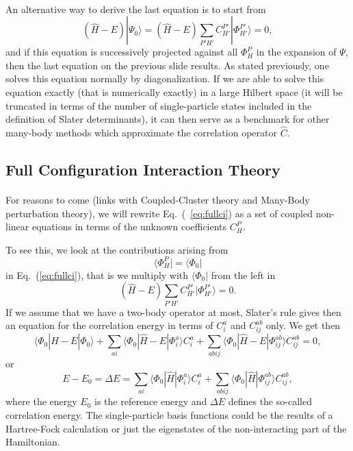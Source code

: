\documentclass[%
twoside,                 %
final,                   %
10pt]{article}
\begin{document}
\paragraph{}
An alternative way to derive the last equation is to start from 
\[
(\hat{H} -E)|\Psi_0\rangle = (\hat{H} -E)\sum_{P'H'}C_{H'}^{P'}|\Phi_{H'}^{P'} \rangle=0, 
\]
and if this equation is successively projected against all $\Phi_H^P$ in the expansion of $\Psi$, then the last equation on the previous slide
results.   As stated previously, one solves this equation normally by diagonalization. If we are able to solve this equation exactly (that is
numerically exactly) in a large Hilbert space (it will be truncated in terms of the number of single-particle states included in the definition
of Slater determinants), it can then serve as a benchmark for other many-body methods which approximate the correlation operator
$\hat{C}$.



\subsection*{Full Configuration Interaction Theory}

\paragraph{}
For reasons to come (links with Coupled-Cluster theory and Many-Body perturbation theory), 
we will rewrite Eq.~(~\ref{eq:fullci}) as a set of coupled non-linear equations in terms of the unknown coefficients $C_H^P$. 

To see this, we look at the contributions arising from 
\[
\langle \Phi_H^P | = \langle \Phi_0|
\]
in  Eq.~(\ref{eq:fullci}), that is we multiply with $\langle \Phi_0 |$
from the left in 
\[
(\hat{H} -E)\sum_{P'H'}C_{H'}^{P'}|\Phi_{H'}^{P'} \rangle=0. 
\]
If we assume that we have a two-body operator at most, Slater's rule gives then an equation for the 
correlation energy in terms of $C_i^a$ and $C_{ij}^{ab}$ only.  We get then
\[
\langle \Phi_0 | \hat{H} -E| \Phi_0\rangle + \sum_{ai}\langle \Phi_0 | \hat{H} -E|\Phi_{i}^{a} \rangle C_{i}^{a}+
\sum_{abij}\langle \Phi_0 | \hat{H} -E|\Phi_{ij}^{ab} \rangle C_{ij}^{ab}=0,
\]
or 
\[
E-E_0 =\Delta E=\sum_{ai}\langle \Phi_0 | \hat{H}|\Phi_{i}^{a} \rangle C_{i}^{a}+
\sum_{abij}\langle \Phi_0 | \hat{H}|\Phi_{ij}^{ab} \rangle C_{ij}^{ab},
\]
where the energy $E_0$ is the reference energy and $\Delta E$ defines the so-called correlation energy.
The single-particle basis functions  could be the results of a Hartree-Fock calculation or just the eigenstates of the non-interacting part of the Hamiltonian. 
\end{document}
